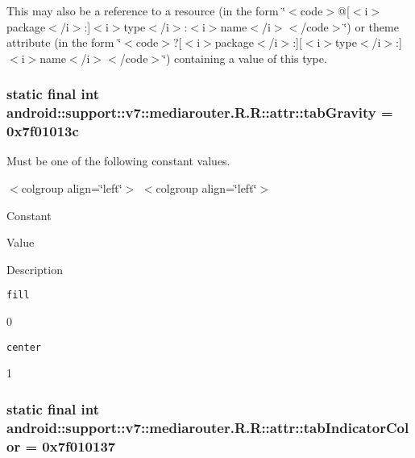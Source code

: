 This may also be a reference to a resource (in the form \char`\"{}$<$code$>$@\mbox{[}$<$i$>$package$<$/i$>$:\mbox{]}$<$i$>$type$<$/i$>$:$<$i$>$name$<$/i$>$$<$/code$>$\char`\"{}) or theme attribute (in the form \char`\"{}$<$code$>$?\mbox{[}$<$i$>$package$<$/i$>$:\mbox{]}\mbox{[}$<$i$>$type$<$/i$>$:\mbox{]}$<$i$>$name$<$/i$>$$<$/code$>$\char`\"{}) containing a value of this type. \hypertarget{classandroid_1_1support_1_1v7_1_1mediarouter_1_1_r_1_1attr_f84f0f8095731dee0845e05f6c368f41}{
\subsubsection[{tabGravity}]{\setlength{\rightskip}{0pt plus 5cm}static final int android::support::v7::mediarouter.R.R::attr::tabGravity = 0x7f01013c}}
\label{classandroid_1_1support_1_1v7_1_1mediarouter_1_1_r_1_1attr_f84f0f8095731dee0845e05f6c368f41}


Must be one of the following constant values. \begin{TabularC}{0}
\hline
\end{TabularC}
$<$colgroup align=\char`\"{}left\char`\"{}$>$ $<$colgroup align=\char`\"{}left\char`\"{}$>$ 

Constant

Value

Description 

{\tt fill}

0

{\tt center}

1\hypertarget{classandroid_1_1support_1_1v7_1_1mediarouter_1_1_r_1_1attr_e8fe8f68376a3bc1a1f83cec3797a9f2}{
\subsubsection[{tabIndicatorColor}]{\setlength{\rightskip}{0pt plus 5cm}static final int android::support::v7::mediarouter.R.R::attr::tabIndicatorColor = 0x7f010137}}
\label{classandroid_1_1support_1_1v7_1_1mediarouter_1_1_r_1_1attr_e8fe8f68376a3bc1a1f83cec3797a9f2}


